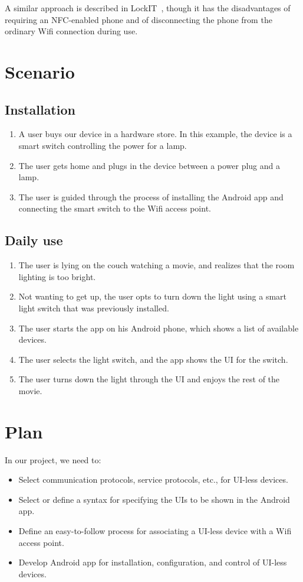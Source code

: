 \documentclass{ubicomp2011}
\begin{document}
A similar approach is described in LockIT~\cite{lockit}, though it has the disadvantages of requiring an NFC-enabled phone  and of disconnecting the phone from the ordinary Wifi  connection during use.

\section{Scenario}
\subsection{Installation}
\begin{enumerate}
\item A user buys our device in a hardware store. In this example, the device is a smart switch controlling the power for a lamp.
\item The user gets home and plugs in the device between a power plug and a lamp.
\item The user is guided through the process of installing the Android app and connecting the smart switch to the Wifi access point.
\end{enumerate}


\subsection{Daily use}
\begin{enumerate}
\item The user is lying on the couch watching a movie, and realizes that the room lighting  is too bright.
\item Not wanting to get up, the user opts to turn down the light using a smart light switch that was previously installed.
\item The user starts the app on his Android phone, which shows a list of available devices.
\item The user selects the light switch, and the app shows the UI for the switch.
\item The user turns down the light through the UI and enjoys the rest of the movie.
\end{enumerate}

\section{Plan}
In our project, we need to:
\begin{itemize}
\item Select communication protocols, service protocols, etc., for UI-less devices.
\item Select or define  a syntax for specifying the UIs to be shown in the Android app.
\item Define an easy-to-follow process for associating a UI-less device with a Wifi access point.
\item Develop Android app for installation, configuration, and control of UI-less devices.
\end{itemize}
\end{document}
